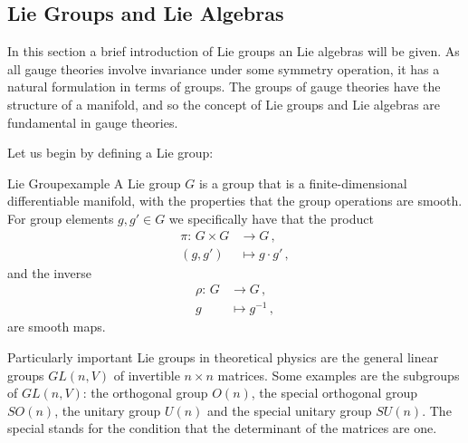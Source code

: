 \subsection*{Lie Groups and Lie Algebras}
In this section a brief introduction of Lie groups an Lie algebras will be given. As all gauge theories involve invariance under some symmetry operation, it has a natural formulation in terms of groups. The groups of gauge theories have the structure of a manifold, and so the concept of Lie groups and Lie algebras are fundamental in gauge theories.

Let us begin by defining a Lie group:
\medskip
\begin{mydef}{Lie Group}{example}
A Lie group $G$ is a group that is a finite-dimensional differentiable manifold, with the properties that the group operations are smooth. For group elements $g,g'\in G$ we specifically have that the product
\begin{align}
    \pi:\,G\times G&\rightarrow G\,,
    \\
    (g,g')&\mapsto g\cdot g'\,,
\end{align}
\textrm{and the inverse}
\begin{align}
    \rho:\,G&\rightarrow G\,,
    \\
    g&\mapsto g^{-1}\,,
\end{align}
\textrm{are smooth maps.}
\end{mydef}\noindent
Particularly important Lie groups in theoretical physics are the general linear groups $GL(n,V)$ of invertible $n\times n$ matrices. Some examples are the subgroups of $GL(n,V)$: the orthogonal group $O(n)$, the special orthogonal group $SO(n)$, the unitary group $U(n)$ and the special unitary group $SU(n)$. The special stands for the condition that the determinant of the matrices are one.

